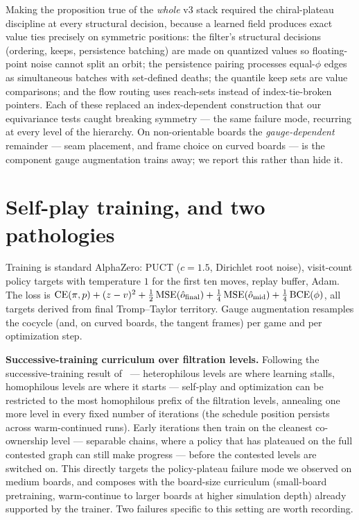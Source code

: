 \documentclass[11pt]{article}
\begin{document}
Making the proposition true of the \emph{whole} v3 stack required the
chiral-plateau discipline at every structural decision, because a
learned field produces exact value ties precisely on symmetric
positions: the filter's structural decisions (ordering, keeps,
persistence batching) are made on quantized values so floating-point
noise cannot split an orbit; the persistence pairing processes
equal-$\phi$ edges as simultaneous batches with set-defined deaths; the
quantile keep sets are value comparisons; and the flow routing uses
reach-sets instead of index-tie-broken pointers. Each of these replaced
an index-dependent construction that our equivariance tests caught
breaking symmetry --- the same failure mode, recurring at every level of
the hierarchy. On non-orientable
boards the \emph{gauge-dependent} remainder --- seam placement, and frame
choice on curved boards --- is the
component gauge augmentation trains away; we report this rather than
hide it.

\section{Self-play training, and two pathologies}
\label{sec:selfplay}
Training is standard AlphaZero: PUCT ($c{=}1.5$, Dirichlet root noise),
visit-count policy targets with temperature $1$ for the first ten moves,
replay buffer, Adam. The loss is
$\mathrm{CE}(\pi, p) + (z-v)^2 + \tfrac12\,\mathrm{MSE}(\hat o_{\rm
final}) + \tfrac14\,\mathrm{MSE}(\hat o_{\rm mid}) +
\tfrac14\,\mathrm{BCE}(\phi)$, all targets derived from final
Tromp--Taylor territory. Gauge augmentation resamples the cocycle (and,
on curved boards, the tangent frames) per
game and per optimization step.

\textbf{Successive-training curriculum over filtration levels.}
Following the successive-training result
of~\cite{leventhal2025filtration} --- heterophilous levels are where
learning stalls, homophilous levels are where it starts --- self-play
and optimization can be restricted to the most homophilous prefix of the
filtration levels, annealing one more level in every fixed number of
iterations (the schedule position persists across warm-continued runs).
Early iterations then train on the cleanest co-ownership level ---
separable chains, where a policy that has plateaued on the full
contested graph can still make progress --- before the contested levels
are switched on. This directly targets the policy-plateau failure mode we
observed on medium boards, and composes with the board-size curriculum
(small-board pretraining, warm-continue to larger boards at higher
simulation depth) already supported by the trainer. Two failures
specific to this setting are worth
recording.
\end{document}

